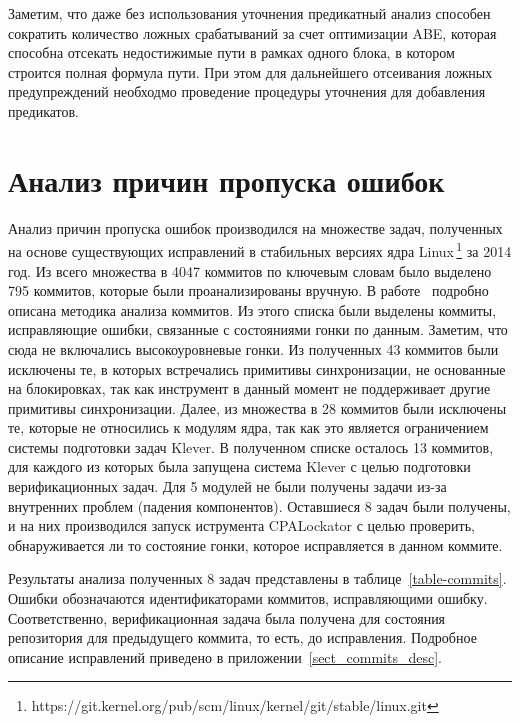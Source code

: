 Заметим, что даже без использования уточнения предикатный анализ способен сократить количество ложных срабатываний за счет оптимизации ABE, которая способна отсекать недостижимые пути в рамках одного блока, в котором строится полная формула пути.
При этом для дальнейшего отсеивания ложных предупреждений необходмо проведение процедуры уточнения для добавления предикатов.

\section{Анализ причин пропуска ошибок}

Анализ причин пропуска ошибок производился на множестве задач, полученных на основе существующих исправлений в стабильных версиях ядра Linux\,\footnote{https://git.kernel.org/pub/scm/linux/kernel/git/stable/linux.git} за 2014 год.
Из всего множества в 4047 коммитов по ключевым словам было выделено 795 коммитов, которые были проанализированы вручную.
В работе~\cite{commit_analysis_12} подробно описана методика анализа коммитов.
Из этого списка были выделены коммиты, исправляющие ошибки, связанные с состояниями гонки по данным.
Заметим, что сюда не включались высокоуровневые гонки.
Из полученных 43 коммитов были исключены те, в которых встречались примитивы синхронизации, не основанные на блокировках, так как инструмент в данный момент не поддерживает другие примитивы синхронизации.
Далее, из множества в 28 коммитов были исключены те, которые не относились к модулям ядра, так как это является ограничением системы подготовки задач Klever.
В полученном списке осталось 13 коммитов, для каждого из которых была запущена система Klever с целью подготовки верификационных задач.
Для 5 модулей не были получены задачи из-за внутренних проблем (падения компонентов).
Оставшиеся 8 задач были получены, и на них производился запуск иструмента CPALockator с целью проверить, обнаруживается ли то состояние гонки, которое исправляется в данном коммите.

Результаты анализа полученных 8 задач представлены в таблице~\ref{table-commits}.
Ошибки обозначаются идентификаторами коммитов, исправляющими ошибку.
Соответственно, верификационная задача была получена для состояния репозитория для предыдущего коммита, то есть, до исправления.
Подробное описание исправлений приведено в приложении~\ref{sect_commits_desc}.

